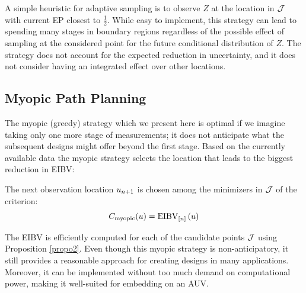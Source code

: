 \documentclass[aoas]{imsart}
\begin{document}
A simple heuristic for adaptive sampling is to observe $Z$ at the
location in $\mathcal{J}$ with current EP closest to
$\frac{1}{2}$. While easy to implement, this strategy can lead to
spending many stages in boundary regions regardless of the possible
effect of sampling at the considered point for the future conditional
distribution of $Z$. The strategy does not account for the expected
reduction in uncertainty, and it does not consider having an
integrated effect over other locations.


\subsection{Myopic Path Planning}
\label{sec:myopic}

The myopic (greedy) strategy which we present here is optimal if we
imagine taking only one more stage of measurements; it does not
anticipate what the subsequent designs might offer beyond the first
stage.  Based on the currently available data the myopic strategy
selects the location that leads to the biggest reduction in EIBV:
\begin{criterion}[Myopic]
The next observation location $u_{n + 1}$ is chosen among
the minimizers in $\mathcal{J}$ of the criterion: 
\begin{equation}\label{critSEQ}
     C_{\text{myopic}}(u) = \EIBV_{[\stage]}\left(\spatloc\right)
\end{equation}
\end{criterion}

The EIBV is efficiently computed for each of the candidate points
$\mathcal{J}$ using Proposition \ref{propo2}. 
Even though this myopic strategy is non-anticipatory, it still
provides a reasonable approach for creating designs in many
applications. Moreover, it can be implemented without too much demand on
computational power, making it well-suited for embedding on an AUV.
\end{document}
